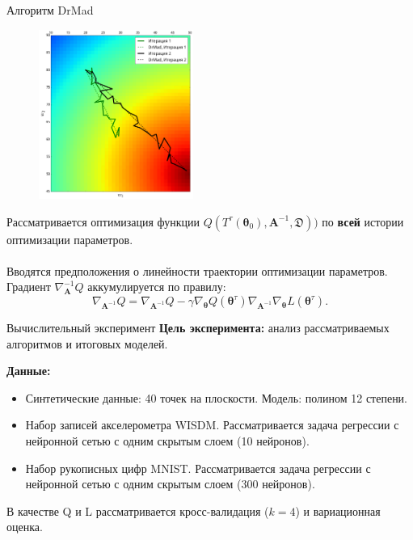 \documentclass[11pt,pdf,utf8,russian,aspectratio=169]{beamer}
\begin{document}
\begin{frame}{Алгоритм DrMad}
\begin{multicols}{2}
\begin{figure}[h]
\includegraphics[width=0.45\textwidth]{./slide_plots/mad.png}
\end{figure}


Рассматривается оптимизация функции $Q(T^\tau(\boldsymbol{\theta}_0) , \mathbf{A}^{-1}, \mathfrak{D}))$ по \textbf{всей} истории оптимизации параметров.\\~\\
Вводятся предположения о линейности траектории оптимизации параметров. \\

Градиент $\nabla_\mathbf{A}^{-1} Q$ аккумулируется по правилу:
$$\nabla_{\mathbf{A}^{-1}} Q= \nabla_{\mathbf{A}^{-1}} Q - \gamma \nabla_{\boldsymbol{\theta}} Q(\boldsymbol{\theta}^\tau) \nabla_{\mathbf{A}^{-1}}  \nabla_{\boldsymbol{\theta}} L(\boldsymbol{\theta}^\tau).
$$
\end{multicols}

\end{frame}

\begin{frame}{Вычислительный эксперимент}
\textbf{Цель эксперимента:} анализ рассматриваемых алгоритмов и итоговых моделей.

\textbf{Данные:}
\begin{itemize}
\item Синтетические данные: 40 точек на плоскости. Модель: полином 12 степени.
\item Набор записей акселерометра WISDM. Рассматривается задача регрессии с нейронной сетью с одним скрытым слоем (10 нейронов).
\item Набор рукописных цифр MNIST. Рассматривается задача регрессии с нейронной сетью с одним скрытым слоем (300 нейронов).
\end{itemize}

В качестве Q и L рассматривается кросс-валидация ($k=4$) и вариационная оценка.
\end{frame}
\end{document}

